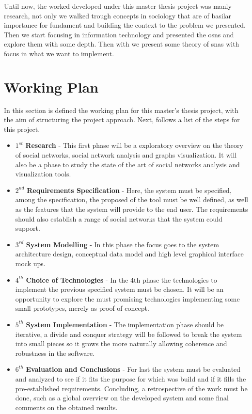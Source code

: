Until now, the worked developed under this master thesis project was manly research, not only we walked trough concepts in sociology that are of basilar importance
for fundament and building the context to the problem we presented. Then we start focusing in information technology and presented the \glspl{osn} and explore them
with some depth. Then with we present some theory of \glspl{sna} with focus in what we want to implement.

\section{Working Plan}

In this section is defined the working plan for this master's thesis project, with the aim of structuring the project approach. Next, follows a list of the steps for this project.

\begin{itemize}
\item $1^{st}$ \textbf{Research} - This first phase will be a exploratory overview on the theory of social networks, social network analysis and graphs visualization. It will also be a phase to study the state of the art of
social networks analysis and visualization tools.
\item $2^{nd}$ \textbf{Requirements Specification} - Here, the system must be specified, among the specification, the proposed of the tool must be well defined, as well as the features
that the system will provide to the end user. The requirements should also establish a range of social networks that the system could support.
\item $3^{rd}$ \textbf{System Modelling} - In this phase the focus goes to the system architecture design, conceptual data model and high level graphical interface mock ups.
\item $4^{th}$ \textbf{Choice of Technologies} - In the 4th phase the technologies to implement the previous specified system must be chosen. It will be an opportunity to explore the
must promising technologies implementing some small prototypes, merely as proof of concept.
\item $5^{th}$ \textbf{System Implementation} - The implementation phase should be iterative, a divide and conquer strategy will be followed to break the system into small pieces so it grows the more naturally allowing
coherence and robustness in the software.
\item $6^{th}$ \textbf{Evaluation and Conclusions} - For last the system must be evaluated and analyzed to see if it fits the purpose for which was build and if it fills the pre-established requirements. Concluding, a retrospective of the work must be done, such as a global overview on the developed system and some final comments on the obtained results.
\end{itemize}

